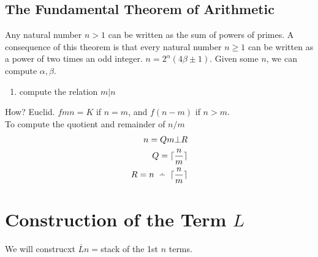 \subsection{The Fundamental Theorem of Arithmetic}
Any natural number $n > 1$ can be written as the sum of powers of primes. A consequence of this theorem is that every natural number $n \geq 1$ can be written as a power of two times an odd integer. $n = 2^\alpha(4\beta \pm 1)$. Given some $n$, we can compute $\alpha,\beta$.\\

\begin{enumerate}[(1)]
  \item compute the relation $m | n$
\end{enumerate}
How? Euclid. $f mn = K$ if $n = m$, and $f (n - m)$ if $n > m$.\\

To compute the quotient and remainder of $n/m$
\begin{eqnarray*}
  n = Qm\bot R\\
  Q = \floor{\dfrac{n}{m}}\\
  R = n \monus \floor{\dfrac{n}{m}}
\end{eqnarray*}

\section{Construction of the Term $L$}
We will construcxt $\overline{L} n = $stack of the 1st $n$ terms.
